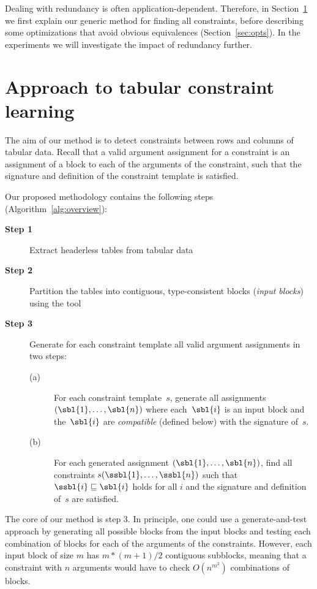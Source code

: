 Dealing with redundancy is often application-dependent.
Therefore, in Section~\ref{sec:approach} we first explain our generic method for finding all constraints, before describing some optimizations that avoid obvious equivalences (Section~\ref{sec:opts}).
In the experiments we will investigate the impact of redundancy further.





\newcommand{\tcl}{Tabular Constraint Learning}
\section{Approach to tabular constraint learning}\label{sec:approach}
The aim of our method is to detect constraints between rows and columns of tabular data. Recall that a valid argument assignment for a constraint is an assignment of a block to each of the arguments of the constraint, such that the signature and definition of the constraint template is satisfied.

Our proposed methodology contains the following steps (Algorithm~\ref{alg:overview}):
\begin{algorithm}
\begin{description}
\item[\textbf{Step 1}] Extract headerless tables from tabular data
\item[\textbf{Step 2}] Partition the tables into contiguous, type-consistent blocks (\textit{input blocks}) using the \ecblockdetect{} tool
\item[\textbf{Step 3}] Generate for each constraint template all valid argument assignments in two steps:
\begin{description}
\item[(a)] For each constraint template~$s$, generate all assignments $(\sbl{1}, \ldots ,\sbl{n})$ where each~$\sbl{i}$ is an input block and the~$\sbl{i}$ are \textit{compatible} (defined below) with the signature of~$s$. 
\item[(b)] For each generated assignment $(\sbl{1}, \ldots ,\sbl{n})$, find all constraints $s(\ssbl{1}, \ldots, \ssbl{n})$ such that $\ssbl{i} \sqsubseteq \sbl{i}$ holds for all $i$ and the signature and definition of~$s$ are satisfied.
\end{description}
\end{description}
\caption{}
\label{alg:overview}
\end{algorithm}

The core of our method is step 3. In principle, one could use a generate-and-test approach by generating all possible blocks from the input blocks and testing each combination of blocks for each of the arguments of the constraints.
However, each input block of size $m$ has $m*(m+1)/2$ contiguous subblocks, meaning that a constraint with $n$ arguments would have to check $O(n^{m^2})$ combinations of blocks.

